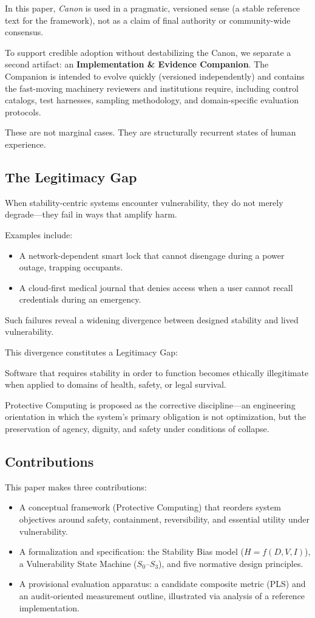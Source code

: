 \documentclass[12pt]{article}
\begin{document}
In this paper, \emph{Canon} is used in a pragmatic, versioned sense (a stable reference text for the framework), not as a claim of final authority or community-wide consensus.

To support credible adoption without destabilizing the Canon, we separate a second artifact: an \textbf{Implementation \& Evidence Companion}. The Companion is intended to evolve quickly (versioned independently) and contains the fast-moving machinery reviewers and institutions require, including control catalogs, test harnesses, sampling methodology, and domain-specific evaluation protocols.

These are not marginal cases. They are structurally recurrent states of human experience.

\subsection{The Legitimacy Gap}
When stability-centric systems encounter vulnerability, they do not merely degrade---they fail in ways that amplify harm.

Examples include:

\begin{itemize}
\item A network-dependent smart lock that cannot disengage during a power outage, trapping occupants.
\item A cloud-first medical journal that denies access when a user cannot recall credentials during an emergency.
\end{itemize}

Such failures reveal a widening divergence between designed stability and lived vulnerability.

This divergence constitutes a Legitimacy Gap:

Software that requires stability in order to function becomes ethically illegitimate when applied to domains of health, safety, or legal survival.

Protective Computing is proposed as the corrective discipline---an engineering orientation in which the system's primary obligation is not optimization, but the preservation of agency, dignity, and safety under conditions of collapse.

\subsection*{Contributions}
This paper makes three contributions:
\begin{itemize}
\item A conceptual framework (Protective Computing) that reorders system objectives around safety, containment, reversibility, and essential utility under vulnerability.
\item A formalization and specification: the Stability Bias model ($H = f(D, V, I)$), a Vulnerability State Machine ($S_0$--$S_3$), and five normative design principles.
\item A provisional evaluation apparatus: a candidate composite metric (PLS) and an audit-oriented measurement outline, illustrated via analysis of a reference implementation.
\end{itemize}
\end{document}
